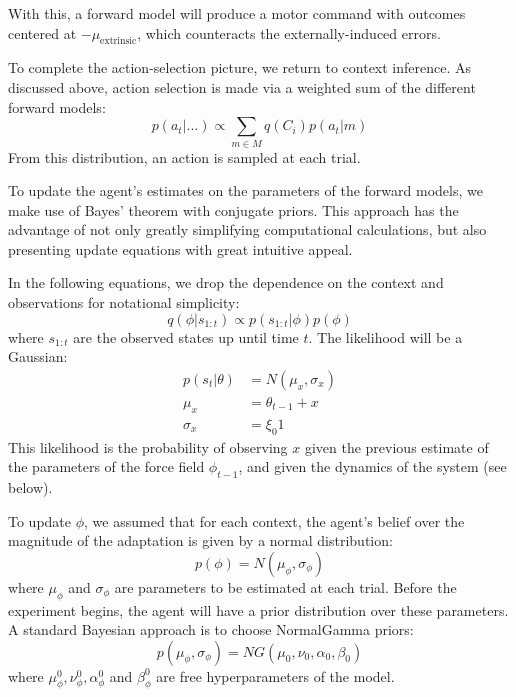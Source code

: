 \documentclass[a4paper,doc,floatsintext,natbib]{apa6}
\begin{document}
With this, a forward model will produce a motor command with outcomes centered
at $-\mu_{\text{extrinsic}}$, which counteracts the externally-induced errors.

To complete the action-selection picture, we return to context inference. As
discussed above, action selection is made via a weighted sum of the different
forward models:
\begin{equation}
p(a_t | ...) \propto \displaystyle \sum_{m \in M} q(C_i)p(a_t | m)
\end{equation}
From this distribution, an action is sampled at each trial.

To update the agent's estimates on the parameters of the forward models, we
make use of Bayes' theorem with conjugate priors. This approach has the
advantage of not only greatly simplifying computational calculations, but also
presenting update equations with great intuitive appeal.

In the following equations, we drop the dependence on the context and
observations for notational simplicity:
\begin{equation}
q(\phi | s_{1:t}) \propto p(s_{1:t} | \phi)p(\phi)
\end{equation}
where $s_{1:t}$ are the observed states up until time $t$. The likelihood will
be a Gaussian:
\begin{align}
  p(s_t | \theta) &= N(\mu_x, \sigma_x)  \\
  \mu_x &= \theta_{t-1} + x \\
  \sigma_x &= \xi_0 1
\end{align}
This likelihood is the probability of observing $x$ given the previous estimate
of the parameters of the force field $\phi_{t-1}$, and given the dynamics of
the system (see below).

To update $\phi$, we assumed that for each context, the agent's belief over
the magnitude of the adaptation is given by a normal distribution:
\begin{equation}
p(\phi) = N(\mu_\phi, \sigma_\phi) \label{eqn:data-dist}
\end{equation}
where $\mu_\phi$ and $\sigma_\phi$ are parameters to be estimated at each
trial. Before the experiment begins, the agent will have a prior distribution
over these parameters. A standard Bayesian approach is to choose NormalGamma
priors:
\begin{equation}
p(\mu_\phi, \sigma_\phi) = NG(\mu_0, \nu_0, \alpha_0, \beta_0)
\end{equation}
where $\mu_{\phi}^0, \nu_{\phi}^0, \alpha_{\phi}^0$ and $\beta_{\phi}^0$ are free hyperparameters of the
model.
\end{document}
